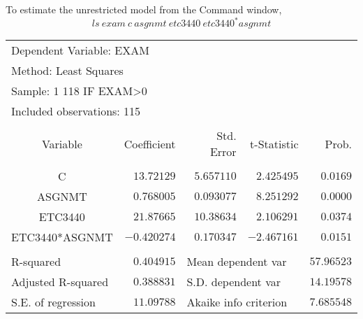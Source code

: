 \documentclass[12pt]{report}
\begin{document}
\noindent To estimate the unrestricted model from the Command window,
$$ls\ exam\ c\ asgnmt\ etc3440\ etc3440^*asgnmt$$
\begin{figure}[H]
	\centering
\end{figure}
\vspace{-\baselineskip}
\begin{table}[H]
	\centering
	\begin{tabular}{lrrrr}
		\multicolumn{3}{l}{Dependent Variable: EXAM}&\multicolumn{1}{c}{}&\multicolumn{1}{c}{}\\
		\multicolumn{3}{l}{Method: Least Squares}&\multicolumn{1}{c}{}&\multicolumn{1}{c}{}\\
		\multicolumn{3}{l}{Sample: 1 118 IF EXAM\textgreater 0}&\multicolumn{1}{c}{}&\multicolumn{1}{c}{}\\
		\multicolumn{3}{l}{Included observations: 115}&\multicolumn{1}{c}{}&\multicolumn{1}{c}{}\\
		[4.5pt] \hline \\ [-4.5pt]
		\multicolumn{1}{c}{Variable}&\multicolumn{1}{r}{Coefficient}&\multicolumn{1}{r}{Std. Error}&\multicolumn{1}{r}{t-Statistic}&\multicolumn{1}{r}{Prob.}\\
		[4.5pt] \hline \\ [-4.5pt]
		\multicolumn{1}{c}{C}&\multicolumn{1}{r}{$13.72129$}&\multicolumn{1}{r}{$5.657110$}&\multicolumn{1}{r}{$2.425495$}&\multicolumn{1}{r}{$0.0169$}\\
		\multicolumn{1}{c}{ASGNMT}&\multicolumn{1}{r}{$0.768005$}&\multicolumn{1}{r}{$0.093077$}&\multicolumn{1}{r}{$8.251292$}&\multicolumn{1}{r}{$0.0000$}\\
		\multicolumn{1}{c}{ETC3440}&\multicolumn{1}{r}{$21.87665$}&\multicolumn{1}{r}{$10.38634$}&\multicolumn{1}{r}{$2.106291$}&\multicolumn{1}{r}{$0.0374$}\\
		\multicolumn{1}{c}{ETC3440*ASGNMT}&\multicolumn{1}{r}{$-0.420274$}&\multicolumn{1}{r}{$0.170347$}&\multicolumn{1}{r}{$-2.467161$}&\multicolumn{1}{r}{$0.0151$}\\
		[4.5pt] \hline \\ [-4.5pt]
		\multicolumn{1}{l}{R-squared}&\multicolumn{1}{r}{$0.404915$}&\multicolumn{2}{l}{Mean dependent var}&\multicolumn{1}{r}{$57.96523$}\\
		\multicolumn{1}{l}{Adjusted R-squared}&\multicolumn{1}{r}{$0.388831$}&\multicolumn{2}{l}{S.D. dependent var}&\multicolumn{1}{r}{$14.19578$}\\
		\multicolumn{1}{l}{S.E. of regression}&\multicolumn{1}{r}{$11.09788$}&\multicolumn{2}{l}{Akaike info criterion}&\multicolumn{1}{r}{$7.685548$}\\

\end{tabular}
\end{table}
\end{document}
